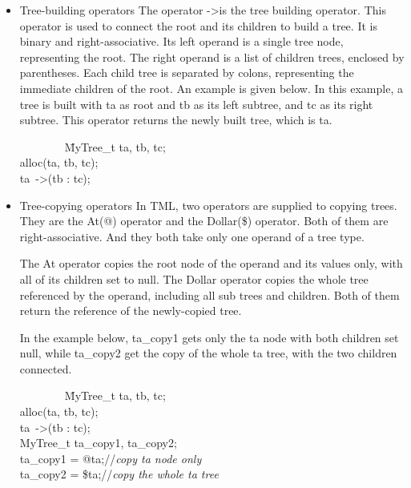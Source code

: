 \documentclass[12pt,psfig,a4]{article}
\begin{document}
\begin{itemize}
\item Tree-building operators
The operator -\textgreater is the tree building operator. This operator is used to connect the root and its children to build a tree. It is binary and right-associative. Its left operand is a single tree node, representing the root. The right operand is a list of children trees, enclosed by parentheses. Each child tree is separated by colons, representing the immediate children of the root. An example is given below. In this example, a tree is built with ta as root and tb as its left subtree, and tc as its right subtree. This operator returns the newly built tree, which is ta.
\begin{code}
\begin{tabbing}
~~~~~~~~\= MyTree\_t ta, tb, tc;\\
\> alloc(ta, tb, tc);\\
\> ta~-\textgreater(tb : tc);
\end{tabbing}
\end{code}

\item Tree-copying operators
In TML, two operators are supplied to copying trees. They are the At(@) operator and the Dollar(\$) operator. Both of them are right-associative. And they both take only one operand of a tree type. 

The At operator copies the root node of the operand and its values only, with all of its children set to null. The Dollar operator copies the whole tree referenced by the operand, including all sub trees and children. Both of them return the reference of the newly-copied tree.

In the example below, ta\_copy1 gets only the ta node with both children set null, while ta\_copy2 get the copy of the whole ta tree, with the two children connected.
\begin{code}
\begin{tabbing}
~~~~~~~~\= MyTree\_t ta, tb, tc;~~~~~~~\=\\
\> alloc(ta, tb, tc);\\
\> ta~-\textgreater(tb : tc);\\
\> MyTree\_t ta\_copy1, ta\_copy2;\\
\> ta\_copy1 = @ta;\>//\textit{copy ta node only}\\
\> ta\_copy2 = \$ta;\>//\textit{copy the whole ta tree }
\end{tabbing}
\end{code}



\end{itemize}
\end{document}

